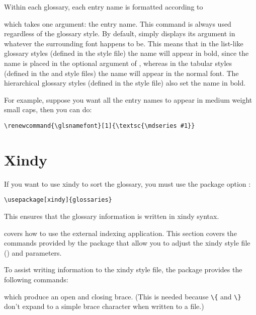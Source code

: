 \documentclass{nlctdoc}
\begin{document}
Within each glossary, each entry name is formatted according to
\begin{definition}[\DescribeMacro{\glsnamefont}]
\end{definition}
which takes one argument: the entry name. This command is always
used regardless of the glossary style. By default, 
simply displays its argument in whatever the surrounding font
happens to be. This means that in the list-like glossary styles
(defined in the  style file) the name will appear
in bold, since the name is placed in the optional argument of
, whereas in the tabular styles (defined in the
 and  style files) the name
will appear in the normal font. The hierarchical glossary styles
(defined in the  style file) also set the name in
bold.

For example, suppose you want all the entry names to appear in 
medium weight small caps, then you can do:
\begin{verbatim}
\renewcommand{\glsnamefont}[1]{\textsc{\mdseries #1}}
\end{verbatim}


\section{Xindy}
\label{sec:xindy}

If you want to use \gls{xindy} to sort the glossary, you
must use the package option :
\begin{verbatim}
\usepackage[xindy]{glossaries}
\end{verbatim}
This ensures that the glossary information is written in 
\gls*{xindy} syntax.

 covers how to use the external
indexing application. This section covers the commands provided
by the  package that allow you to adjust the
\gls{xindy} style file () and parameters.

To assist writing information to the \gls{xindy} style
file, the  package provides the following
commands:
\begin{definition}[\DescribeMacro{\glsopenbrace}]
\end{definition}
\begin{definition}[\DescribeMacro{\glsclosebrace}]
\end{definition}
which produce an open and closing brace. (This is needed because
\verb|\{| and \verb|\}| don't expand to a simple brace character
when written to a file.)
\end{document}
